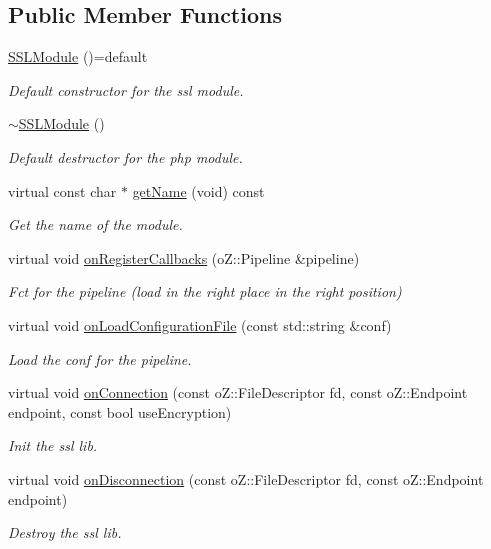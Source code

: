 \subsection*{Public Member Functions}
\begin{DoxyCompactItemize}
\item 
\hyperlink{class_s_s_l_module_aff377c899776ca1e5ec94bb4b37e01db}{S\+S\+L\+Module} ()=default
\begin{DoxyCompactList}\small\item\em Default constructor for the ssl module. \end{DoxyCompactList}\item 
\hyperlink{class_s_s_l_module_a9d8061dd774544fb6eee57803b17f83d}{$\sim$\+S\+S\+L\+Module} ()
\begin{DoxyCompactList}\small\item\em Default destructor for the php module. \end{DoxyCompactList}\item 
virtual const char $\ast$ \hyperlink{class_s_s_l_module_a811d3b0f9f932791abbc89f1ecf2a1c3}{get\+Name} (void) const
\begin{DoxyCompactList}\small\item\em Get the name of the module. \end{DoxyCompactList}\item 
virtual void \hyperlink{class_s_s_l_module_ad2bcf5908355b434e45ea156a49f7d39}{on\+Register\+Callbacks} (o\+Z\+::\+Pipeline \&pipeline)
\begin{DoxyCompactList}\small\item\em Fct for the pipeline (load in the right place in the right position) \end{DoxyCompactList}\item 
virtual void \hyperlink{class_s_s_l_module_ac4592260a1fff11950ea1a20d2dd9729}{on\+Load\+Configuration\+File} (const std\+::string \&conf)
\begin{DoxyCompactList}\small\item\em Load the conf for the pipeline. \end{DoxyCompactList}\item 
virtual void \hyperlink{class_s_s_l_module_a514e3d618be55df6f5fc2f489e70d915}{on\+Connection} (const o\+Z\+::\+File\+Descriptor fd, const o\+Z\+::\+Endpoint endpoint, const bool use\+Encryption)
\begin{DoxyCompactList}\small\item\em Init the ssl lib. \end{DoxyCompactList}\item 
virtual void \hyperlink{class_s_s_l_module_a54cda727b3f282b0be43f132411edcd2}{on\+Disconnection} (const o\+Z\+::\+File\+Descriptor fd, const o\+Z\+::\+Endpoint endpoint)
\begin{DoxyCompactList}\small\item\em Destroy the ssl lib. \end{DoxyCompactList}\end{DoxyCompactItemize}


